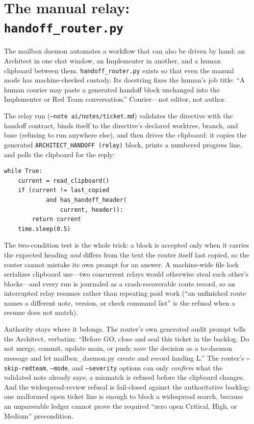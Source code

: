 \documentclass[10pt,aps,prd,twocolumn,nofootinbib]{revtex4-2}
\newcommand{\code}[1]{\texttt{#1}}
\newcommand{\file}[1]{\texttt{#1}}
\begin{document}
\section{The manual relay: \file{handoff\_router.py}}
\label{sec:router}

The mailbox daemon automates a workflow that can also be driven by
hand: an Architect in one chat window, an Implementer in another, and
a human clipboard between them.  \file{handoff\_router.py} exists so
that even the manual mode has machine-checked custody.  Its docstring
fixes the human's job title: ``A human courier may paste a generated
handoff block unchanged into the Implementer or Red Team
conversation.''  Courier---not editor, not author.

The relay run (\code{--note ai/notes/ticket.md}) validates the
directive with the handoff contract, binds itself to the directive's
declared worktree, branch, and base (refusing to run anywhere else),
and then drives the clipboard: it copies the generated
\code{ARCHITECT\_HANDOFF (relay)} block, prints a numbered progress
line, and polls the clipboard for the reply:

\begin{verbatim}
while True:
    current = read_clipboard()
    if (current != last_copied
            and has_handoff_header(
                current, header)):
        return current
    time.sleep(0.5)
\end{verbatim}

The two-condition test is the whole trick: a block is accepted only
when it carries the expected heading \emph{and} differs from the text
the router itself last copied, so the router cannot mistake its own
prompt for an answer.  A machine-wide file lock serializes clipboard
use---two concurrent relays would otherwise steal each other's
blocks---and every run is journaled as a crash-recoverable route
record, so an interrupted relay resumes rather than repeating paid
work (``an unfinished route names a different note, version, or check
command list'' is the refusal when a resume does not match).

Authority stays where it belongs.  The router's own generated audit
prompt tells the Architect, verbatim: ``Before GO, close and seal this
ticket in the backlog.  Do not merge, commit, update main, or push;
save the decision as a to-daemon message and let mailbox\_daemon.py
create and record landing L.''  The router's \code{--skip-redteam},
\code{--mode}, and \code{--severity} options can only \emph{confirm}
what the validated note already says; a mismatch is refused before the
clipboard changes.  And the widespread-review refusal is fail-closed
against the authoritative backlog: one malformed open ticket line is
enough to block a widespread search, because an unparseable ledger
cannot prove the required ``zero open Critical, High, or Medium''
precondition.
\end{document}
